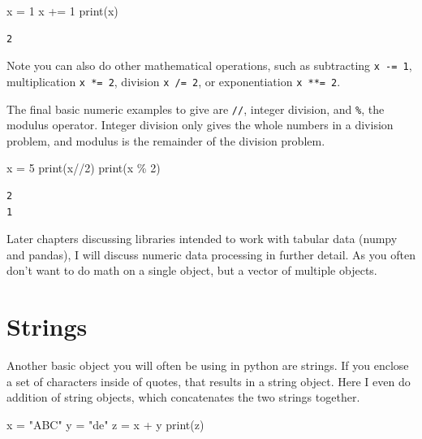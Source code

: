 \documentclass[
  letterpaper,
]{scrbook}
\newenvironment{Shaded}{\begin{snugshade}}{\end{snugshade}}
\newcommand{\BuiltInTok}[1]{\textcolor[rgb]{0.00,0.23,0.31}{#1}}
\newcommand{\DecValTok}[1]{\textcolor[rgb]{0.68,0.00,0.00}{#1}}
\newcommand{\NormalTok}[1]{\textcolor[rgb]{0.00,0.23,0.31}{#1}}
\newcommand{\OperatorTok}[1]{\textcolor[rgb]{0.37,0.37,0.37}{#1}}
\newcommand{\StringTok}[1]{\textcolor[rgb]{0.13,0.47,0.30}{#1}}
\begin{document}
\begin{Shaded}
\begin{Highlighting}[]
\NormalTok{x }\OperatorTok{=} \DecValTok{1}
\NormalTok{x }\OperatorTok{+=} \DecValTok{1}
\BuiltInTok{print}\NormalTok{(x)}
\end{Highlighting}
\end{Shaded}

\begin{verbatim}
2
\end{verbatim}

Note you can also do other mathematical operations, such as subtracting
\texttt{x\ -=\ 1}, multiplication \texttt{x\ *=\ 2}, division
\texttt{x\ /=\ 2}, or exponentiation \texttt{x\ **=\ 2}.

The final basic numeric examples to give are \texttt{//}, integer
division, and \texttt{\%}, the modulus operator. Integer division only
gives the whole numbers in a division problem, and modulus is the
remainder of the division problem.

\begin{Shaded}
\begin{Highlighting}[]
\NormalTok{x }\OperatorTok{=} \DecValTok{5}
\BuiltInTok{print}\NormalTok{(x}\OperatorTok{//}\DecValTok{2}\NormalTok{)}
\BuiltInTok{print}\NormalTok{(x }\OperatorTok{\%} \DecValTok{2}\NormalTok{)}
\end{Highlighting}
\end{Shaded}

\begin{verbatim}
2
1
\end{verbatim}

Later chapters discussing libraries intended to work with tabular data
(numpy and pandas), I will discuss numeric data processing in further
detail. As you often don't want to do math on a single object, but a
vector of multiple objects.

\section{Strings}\label{subsec-strings}

Another basic object you will often be using in python are strings. If
you enclose a set of characters inside of quotes, that results in a
string object. Here I even do addition of string objects, which
concatenates the two strings together.

\begin{Shaded}
\begin{Highlighting}[]
\NormalTok{x }\OperatorTok{=} \StringTok{"ABC"}
\NormalTok{y }\OperatorTok{=} \StringTok{"de"}
\NormalTok{z }\OperatorTok{=}\NormalTok{ x }\OperatorTok{+}\NormalTok{ y}
\BuiltInTok{print}\NormalTok{(z)}
\end{Highlighting}
\end{Shaded}
\end{document}
